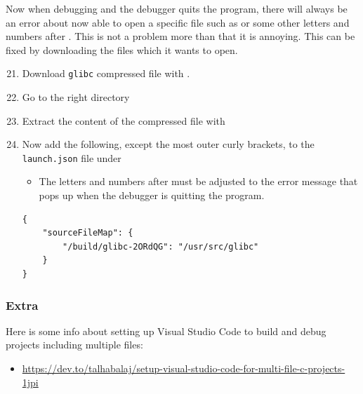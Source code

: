 \newpage
Now when debugging and the debugger quits the program, there will always be an error about now able to open a specific file such as  or some other letters and numbers after . This is not a problem more than that it is annoying. This can be fixed by downloading the files which it wants to open.

\begin{enumerate}
    \setcounter{enumi}{20}
    
    \item Download \texttt{glibc} compressed file with .
    
    \item Go to the right directory 
    
    \item Extract the content of the compressed file with 
    
    \item Now add the following, except the most outer curly brackets, to the \texttt{launch.json} file under\\
    \begin{itemize}
        \item The letters and numbers after  must be adjusted to the error message that pops up when the debugger is quitting the program.
    \end{itemize}
    
\begin{verbatim}
{
    "sourceFileMap": {
        "/build/glibc-2ORdQG": "/usr/src/glibc"
    }
}
\end{verbatim}

\end{enumerate}
\subsubsection{Extra}
Here is some info about setting up Visual Studio Code to build and debug projects including multiple  files:
\begin{itemize}
    \item \url{https://dev.to/talhabalaj/setup-visual-studio-code-for-multi-file-c-projects-1jpi}
\end{itemize}